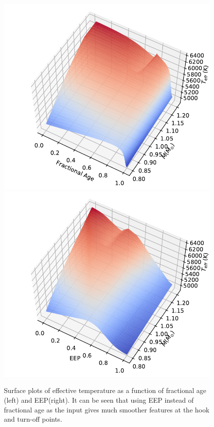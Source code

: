 \begin{figure}
        \includegraphics[width=1.\columnwidth]{2d_fage_data.pdf}
	\includegraphics[width=1.\columnwidth]{2d_EEP_data.pdf}
     \caption{Surface plots of effective temperature as a function of fractional age (left) and EEP(right). It can be seen that using EEP instead of fractional age as the input gives much smoother features at the hook and turn-off points.}
    \label{fig:eep}
\end{figure}

